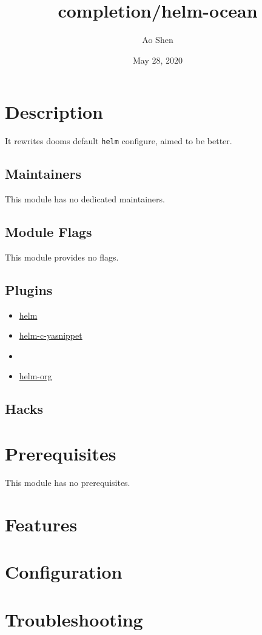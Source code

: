 \documentclass[11pt]{article}
\author{Ao Shen}
\date{May 28, 2020}
\title{completion/helm-ocean}
\begin{document}
\maketitle
\tableofcontents


\section{Description}
\label{sec:org9a13178}
It rewrites dooms default \texttt{helm} configure, aimed to be better.

\subsection{Maintainers}
\label{sec:org92565c6}
This module has no dedicated maintainers.

\subsection{Module Flags}
\label{sec:org5d2310b}
This module provides no flags.

\subsection{Plugins}
\label{sec:org6fb927f}
\begin{itemize}
\item \href{https://github.com/emacs-helm/helm}{helm}
\item \href{https://github.com/emacs-jp/helm-c-yasnippet}{helm-c-yasnippet}
\item 

\item \href{https://github.com/emacs-helm/helm-org}{helm-org}
\end{itemize}

\subsection{Hacks}
\label{sec:orgb07583b}

\section{Prerequisites}
\label{sec:org624b7be}
This module has no prerequisites.

\section{Features}
\label{sec:orge84426b}

\section{Configuration}
\label{sec:orgced0315}

\section{Troubleshooting}
\label{sec:org2c6a7a2}
\end{document}
